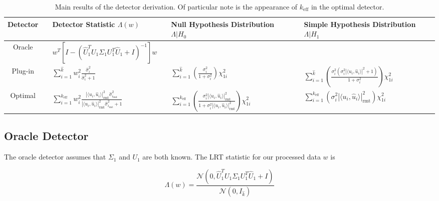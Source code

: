 \begin{table}[!ht]
\centering
\begin{tabular}{cclclcl}\toprule
 Detector & \phantom{a} & Detector Statistic $\Lambda(w)$ & \phantom{a} & Null Hypothesis Distribution $\Lambda|H_0$& \phantom{a} & Simple Hypothesis Distribution $\Lambda|H_1$\\
\midrule
Oracle && $ w^T\left[I-\left(\widehat{U}_1^TU_1\Sigma_1U_1^T\widehat{U}_1+I\right)^{-1}\right]w$ &&  && \\
Plug-in && $\sum_{i=1}^{\widehat{k}}w_i^2\frac{\widehat{\sigma}_i^2}{\widehat{\sigma}_i^2+1}$ && $\sum_{i=1}^{\widehat{k}}\left(\frac{\sigma_i^2}{1+\sigma_i^2}\right)\chi^2_{1i}$ && $\sum_{i=1}^{\widehat{k}}\left(\frac{\sigma_i^2\left(\sigma^2_i|\langle u_i,\widehat{u}_i\rangle|^2+1\right)}{1+\sigma_i^2}\right)\chi^2_{1i}$\\
 Optimal&& $\sum_{i=1}^{k_\text{eff}}w_i^2\frac{|\langle u_i,\widehat{u}_i\rangle|^2_{\text{rmt}}\widehat{\sigma}_{i_\text{rmt}}^2}{|\langle u_i,\widehat{u}_i\rangle|^2_{\text{rmt}}\widehat{\sigma}_{i_\text{rmt}}^2 + 1}$ && $\sum_{i=1}^{k_\text{eff}}\left(\frac{\sigma_i^2|\langle u_i,\widehat{u}_i\rangle|^2_{\text{rmt}}}{1+\sigma_i^2|\langle u_i,\widehat{u}_i\rangle|^2_{\text{rmt}}}\right)\chi^2_{1i}$ && $\sum_{i=1}^{k_\text{eff}}\left(\sigma^2_i|\langle u_i,\widehat{u}_i\rangle|^2_{\text{rmt}}\right)\chi^2_{1i}$\\
\bottomrule
\end{tabular}
\caption{Main results of the detector derivation. Of particular note is the appearance of $k_\text{eff}$ in the optimal detector.}
\label{table: main results}
\end{table}

\subsection{Oracle Detector}\label{sec:oracle}

The oracle detector assumes that $\Sigma_1$ and $U_1$ are both known. The LRT statistic for our processed data $w$ is

\begin{equation*}
\Lambda(w)=\frac{\mathcal{N}(0,\widehat{U}_1^TU_1\Sigma_1U_1^T\widehat{U}_1 +I)}{\mathcal{N}(0,I_{\widehat{k}})}
\end{equation*}

